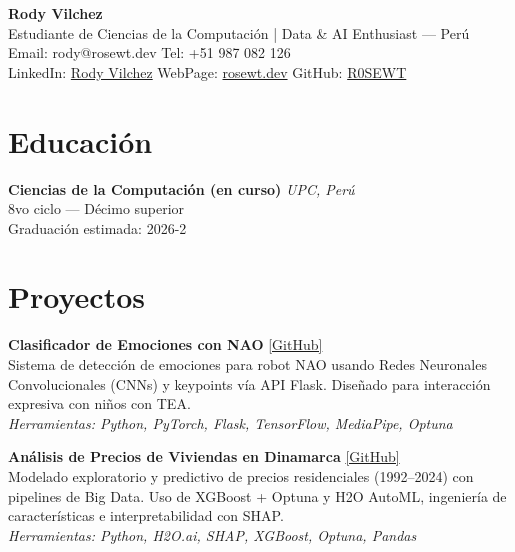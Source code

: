 \documentclass[a4paper,10pt]{article}
\begin{document}
\begin{center}
    \textbf{\Large Rody Vilchez}\\
    \vspace{0.3em}
    \normalsize
    Estudiante de Ciencias de la Computación | Data \& AI Enthusiast — Perú\\
    Email: {rody@rosewt.dev} \quad
    Tel: +51 987 082 126\\
    LinkedIn: \href{https://www.linkedin.com/in/r0sewt/}{Rody Vilchez} \quad
    WebPage: \href{https://rosewt.dev}{rosewt.dev}
    GitHub: \href{https://github.com/r0sewt}{R0SEWT}


\end{center}

\vspace{1em}

\section*{Educación}
\textbf{Ciencias de la Computación (en curso)} \hfill \textit{UPC, Perú}\\
8vo ciclo — Décimo superior\\
Graduación estimada: 2026-2


\section*{Proyectos}

\textbf{Clasificador de Emociones con NAO} \hfill \href{https://github.com/R0SEWT/nao-cnn-emotion}{[GitHub]}\\
Sistema de detección de emociones para robot NAO usando Redes Neuronales Convolucionales (CNNs) y keypoints vía API Flask. Diseñado para interacción expresiva con niños con TEA.\\
\textit{Herramientas: Python, PyTorch, Flask, TensorFlow, MediaPipe, Optuna}

\vspace{0.7em}

\textbf{Análisis de Precios de Viviendas en Dinamarca} \hfill \href{https://github.com/R0SEWT/Denmark-HousePrices-Analysis}{[GitHub]}\\
Modelado exploratorio y predictivo de precios residenciales (1992–2024) con pipelines de Big Data. Uso de XGBoost + Optuna y H2O AutoML, ingeniería de características e interpretabilidad con SHAP.\\
\textit{Herramientas: Python, H2O.ai, SHAP, XGBoost, Optuna, Pandas}
\end{document}
